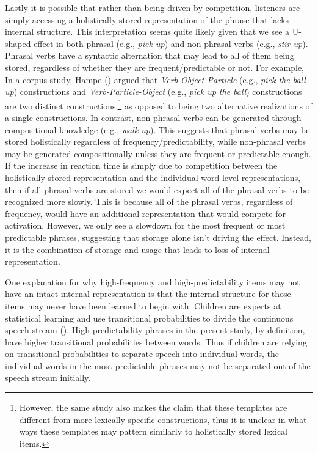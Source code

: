 \documentclass[
  12pt,
  letterpaper,
]{scrreport}
\begin{document}
Lastly it is possible that rather than being driven by competition,
listeners are simply accessing a holistically stored representation of
the phrase that lacks internal structure. This interpretation seems
quite likely given that we see a U-shaped effect in both phrasal (e.g.,
\emph{pick up}) and non-phrasal verbs (e.g., \emph{stir up}). Phrasal
verbs have a syntactic alternation that may lead to all of them being
stored, regardless of whether they are frequent/predictable or not. For
example, In a corpus study, Hampe
() argued that
\emph{Verb-Object-Particle} (e.g., \emph{pick the ball up})
constructions and \emph{Verb-Particle-Object} (e.g., \emph{pick up the
ball}) constructions are two distinct constructions,\footnote{However,
  the same study also makes the claim that these templates are different
  from more lexically specific constructions, thus it is unclear in what
  ways these templates may pattern similarly to holistically stored
  lexical items.} as opposed to being two alternative realizations of a
single constructions. In contrast, non-phrasal verbs can be generated
through compositional knowledge (e.g., \emph{walk up}). This suggests
that phrasal verbs may be stored holistically regardless of
frequency/predictability, while non-phrasal verbs may be generated
compositionally unless they are frequent or predictable enough. If the
increase in reaction time is simply due to competition between the
holistically stored representation and the individual word-level
representations, then if all phrasal verbs are stored we would expect
all of the phrasal verbs to be recognized more slowly. This is because
all of the phrasal verbs, regardless of frequency, would have an
additional representation that would compete for activation. However, we
only see a slowdown for the most frequent or most predictable phrases,
suggesting that storage alone isn't driving the effect. Instead, it is
the combination of storage and usage that leads to loss of internal
representation.

One explanation for why high-frequency and high-predictability items may
not have an intact internal representation is that the internal
structure for those items may never have been learned to begin with.
Children are experts at statistical learning and use transitional
probabilities to divide the continuous speech stream
(). High-predictability phrases in the present study, by definition,
have higher transitional probabilities between words. Thus if children
are relying on transitional probabilities to separate speech into
individual words, the individual words in the most predictable phrases
may not be separated out of the speech stream initially.
\end{document}
